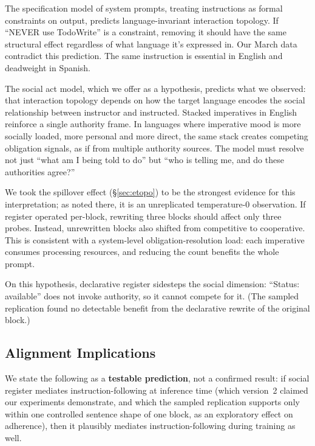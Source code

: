 \documentclass[11pt,a4paper]{article}
\begin{document}
The specification model of system prompts, treating instructions as formal
constraints on output, predicts language-invariant interaction
topology. If ``NEVER use TodoWrite'' is a constraint, removing it
should have the same structural effect regardless of what language
it's expressed in. Our March data contradict this prediction. The same
instruction is essential in English and deadweight in Spanish.

The social act model, which we offer as a hypothesis, predicts what we observed: that
interaction topology depends on how the target language encodes the
social relationship between instructor and instructed. Stacked
imperatives in English reinforce a single authority frame. In
languages where imperative mood is more socially loaded, more
personal and more direct, the same stack creates competing obligation
signals, as if from multiple authority sources. The model must
resolve not just ``what am I being told to do'' but ``who is telling
me, and do these authorities agree?''

We took the spillover effect (\S\ref{sec:etopo}) to be the strongest
evidence for this interpretation; as noted there, it is an unreplicated
temperature-0 observation. If register operated per-block, rewriting
three blocks should affect only three probes. Instead, unrewritten
blocks also shifted from competitive to cooperative. This is
consistent with a system-level obligation-resolution load: each
imperative consumes processing resources, and reducing the count
benefits the whole prompt.

On this hypothesis, declarative register sidesteps the social
dimension: ``Status: available'' does not invoke authority, so it
cannot compete for it. (The sampled replication found no detectable
benefit from the declarative rewrite of the original block.)

\subsection{Alignment Implications}
\label{sec:alignment}

We state the following as a \textbf{testable prediction}, not a
confirmed result: if social register mediates instruction-following
at inference time (which version~2 claimed our experiments
demonstrate, and which the sampled replication supports only within
one controlled sentence shape of one block, as an exploratory effect on adherence), then it
plausibly mediates instruction-following during training as well.
\end{document}
